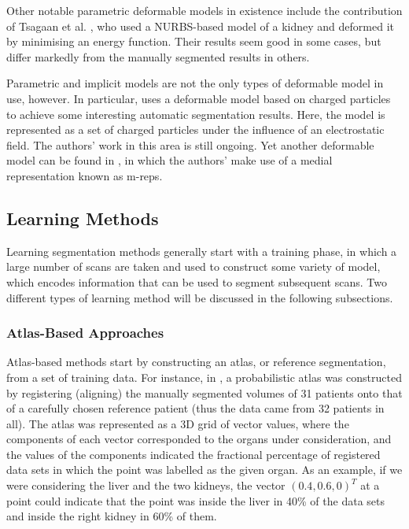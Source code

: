 Other notable parametric deformable models in existence include the contribution of Tsagaan et al. \cite{tsagaan02}, who used a NURBS-based model of a kidney and deformed it by minimising an energy function. Their results seem good in some cases, but differ markedly from the manually segmented results in others.

Parametric and implicit models are not the only types of deformable model in use, however. In particular, \cite{jalba04} uses a deformable model based on charged particles to achieve some interesting automatic segmentation results. Here, the model is represented as a set of charged particles under the influence of an electrostatic field. The authors' work in this area is still ongoing. Yet another deformable model can be found in \cite{pizer03}, in which the authors' make use of a medial representation known as m-reps.

\subsection{Learning Methods}

Learning segmentation methods generally start with a training phase, in which a large number of scans are taken and used to construct some variety of model, which encodes information that can be used to segment subsequent scans. Two different types of learning method will be discussed in the following subsections.

\subsubsection{Atlas-Based Approaches}


Atlas-based methods start by constructing an atlas, or reference segmentation, from a set of training data. For instance, in \cite{park03}, a probabilistic atlas was constructed by registering (aligning) the manually segmented volumes of 31 patients onto that of a carefully chosen reference patient (thus the data came from 32 patients in all). The atlas was represented as a 3D grid of vector values, where the components of each vector corresponded to the organs under consideration, and the values of the components indicated the fractional percentage of registered data sets in which the point was labelled as the given organ. As an example, if we were considering the liver and the two kidneys, the vector $(0.4, 0.6, 0)^T$ at a point could indicate that the point was inside the liver in 40\% of the data sets and inside the right kidney in 60\% of them.

